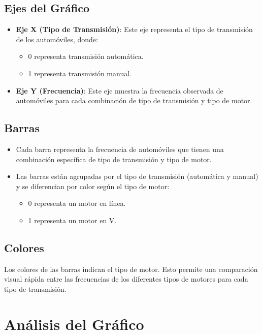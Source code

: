 \documentclass{article}
\begin{document}
\subsection{Ejes del Gráfico}
\begin{itemize}
	\item \textbf{Eje X (Tipo de Transmisión)}: Este eje representa el tipo de transmisión de los automóviles, donde:
	      \begin{itemize}
		      \item 0 representa transmisión automática.
		      \item 1 representa transmisión manual.
	      \end{itemize}
	\item \textbf{Eje Y (Frecuencia)}: Este eje muestra la frecuencia observada de automóviles para cada combinación de tipo de transmisión y tipo de motor.
\end{itemize}

\subsection{Barras}
\begin{itemize}
	\item Cada barra representa la frecuencia de automóviles que tienen una combinación específica de tipo de transmisión y tipo de motor.
	\item Las barras están agrupadas por el tipo de transmisión (automática y manual) y se diferencian por color según el tipo de motor:
	      \begin{itemize}
		      \item 0 representa un motor en línea.
		      \item 1 representa un motor en V.
	      \end{itemize}
\end{itemize}

\subsection{Colores}
Los colores de las barras indican el tipo de motor. Esto permite una comparación visual rápida entre las frecuencias de los diferentes tipos de motores para cada tipo de transmisión.

\section{Análisis del Gráfico}
\end{document}
